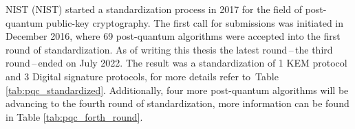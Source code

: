 NIST (\acl{NIST}) started a standardization process in 2017 for the field of post-quantum public-key cryptography. The first call for submissions was initiated in December 2016, where 69 post-quantum algorithms were accepted into the first round of standardization. As of writing this thesis the latest round\,--\,the third round\,--\,ended on July 2022. The result was a standardization of 1 KEM protocol and 3 Digital signature protocols, for more details refer to~Table \ref{tab:pqc_standardized}. Additionally, four more post-quantum algorithms will be advancing to the fourth round of standardization, more information can be found in Table \ref{tab:pqc_forth_round}. \cite{Alagic2022}

